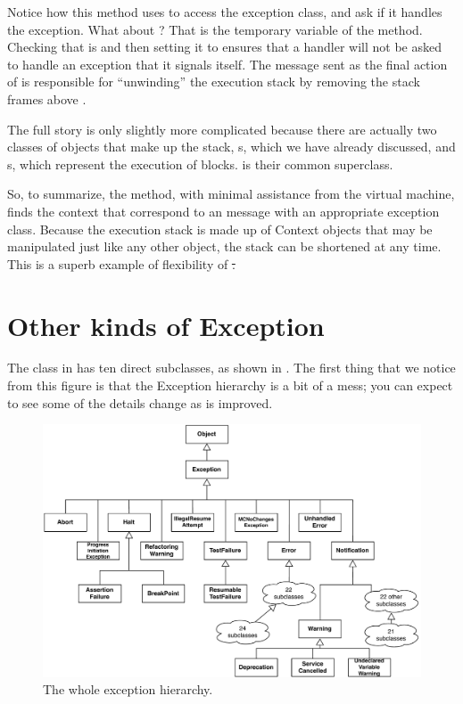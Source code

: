 \documentclass[a4paper,10pt,twoside]{book}
\begin{document}
Notice how this method uses  to access the exception class, and ask if it handles the exception.   What about  ?  That is the temporary variable  of the  method.   Checking that  is  and then setting it to  ensures that a handler will not be asked to handle an exception that it signals itself. 
The  message sent as the final action of  is responsible for ``unwinding'' the execution stack by removing the stack frames above \self{}.

The full story is only slightly more complicated because there are actually two classes of objects that make up the stack, s, which we have already discussed, and s, which represent the execution of blocks.   is their common superclass.

So, to summarize, the  method, with minimal assistance from the virtual machine, finds the context that correspond to an  message with an appropriate exception class.   Because the execution stack is made up of Context objects that may be manipulated just like any other object, the stack can be shortened at any time.  This is a superb example of flexibility of \st.

\section{Other kinds of Exception}

The class  in \pharo{} has ten direct subclasses, as shown in .
The first thing that we notice from this figure is that the Exception hierarchy is a bit of a mess; you can expect to see some of the details change as \pharo{} is improved.

\begin{figure}[ht]\centering
        \includegraphics[width=.95\linewidth]{ExceptionSubclasses}
        \caption{The whole \pharo exception hierarchy.}
\end{figure}
\end{document}
